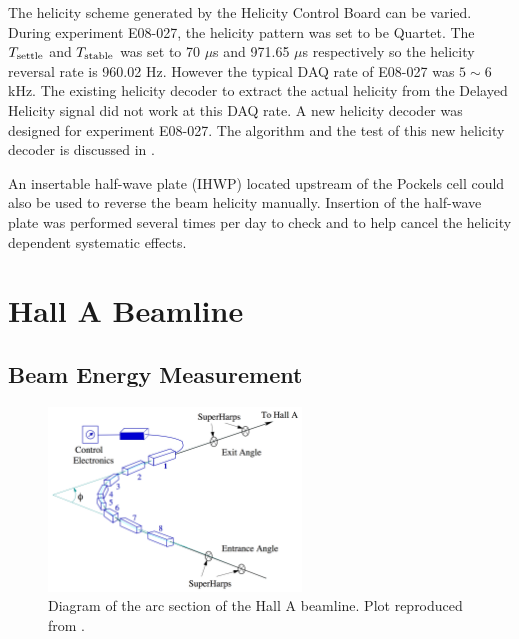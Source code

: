 The helicity scheme generated by the Helicity Control Board can be varied. During experiment E08-027, the helicity pattern was set to be Quartet. The $T_{\mathrm{settle}}$ and $T_{\mathrm{stable}}$ was set to 70 $\mu$s and 971.65 $\mu$s respectively so the helicity reversal rate is 960.02 Hz. However the typical DAQ rate of E08-027 was $5\sim6$ kHz. The existing helicity decoder to extract the actual helicity from the Delayed Helicity signal did not work at this DAQ rate. A new helicity decoder was designed for experiment E08-027. The algorithm and the test of this new helicity decoder is discussed in .

An insertable half-wave plate (IHWP) located upstream of the Pockels cell could also be used to reverse the beam helicity manually. Insertion of the half-wave plate was performed several times per day to check and to help cancel the helicity dependent systematic effects.

\section{Hall A Beamline}
\label{C5S2}

\subsection{Beam Energy Measurement}
\label{C5S2SS1}

\begin{figure}[b!]
  \centering
  \includegraphics[width=0.6\textwidth]{figs/arc-measurement.png}
  \caption[Diagram of the arc section of the beamline.]{Diagram of the arc section of the Hall A beamline. Plot reproduced from \cite{Zheng2002}.  \label{C5S2SS1F1}}
\end{figure}


